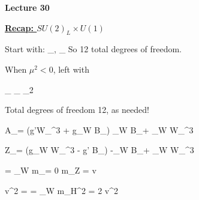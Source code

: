 



\thispagestyle{fancy}

\begin{center}
{\huge \textbf{Lecture 30}}
\end{center}

{\fontsize{14}{16}\selectfont


\textbf{\underline{Recap: $SU(2)_L \times U(1)$}}


Start with:  
\be
{}_{}, \hspace*{0.2in} _{}
\ee
So 12 total degrees of freedom.

When $\mu^2 < 0$, left with


\be
{}_{} \hspace*{0.3in} _{} \hspace*{0.3in} \underbrace{\gamma}_{2}
\ee

Total degrees of freedom 12, as needed!


\be
A_\mu = (g'W_\mu^3 + g_W B_\mu)  \equiv \cos \theta_W B_\mu + \sin \theta_W W_\mu^3
\ee

\be
Z_\mu = (g_W W_\mu^3 - g' B_\mu)  \equiv -\sin \theta_W B_\mu + \cos \theta_W W_\mu^3
\ee

\be
{} = \tan \theta_W  \hspace*{1in} m_\gamma = 0 \hspace*{1in} m_Z =   v
\ee


\be
v^2 =   \GeV  \hspace*{1in}  = \cos \theta_W \hspace*{1in} m_H^2 = 2 \lambda v^2
\ee

}
